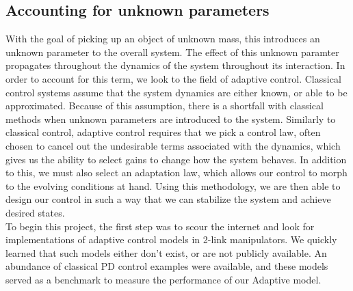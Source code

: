 \subsection*{Accounting for unknown parameters}
With the goal of picking up an object of unknown mass, this introduces an unknown parameter to the overall system. The effect of this unknown paramter propagates throughout the dynamics of the system throughout its interaction. In order to account for this term, we look to the field of adaptive control. Classical control systems assume that the system dynamics are either known, or able to be approximated. Because of this assumption, there is a shortfall with classical methods when unknown parameters are introduced to the system. Similarly to classical control, adaptive control requires that we pick a control law, often chosen to cancel out the undesirable terms associated with the dynamics, which gives us the ability to select gains to change how the system behaves. In addition to this, we must also select an adaptation law, which allows our control to morph to the evolving conditions at hand. Using this methodology, we are then able to design our control in such a way that we can stabilize the system and achieve desired states.\\

To begin this project, the first step was to scour the internet and look for implementations of adaptive control models in 2-link manipulators. We quickly learned that such models either don't exist, or are not publicly available. An abundance of classical PD control examples were available, and these models served as a benchmark to measure the performance of our Adaptive model.